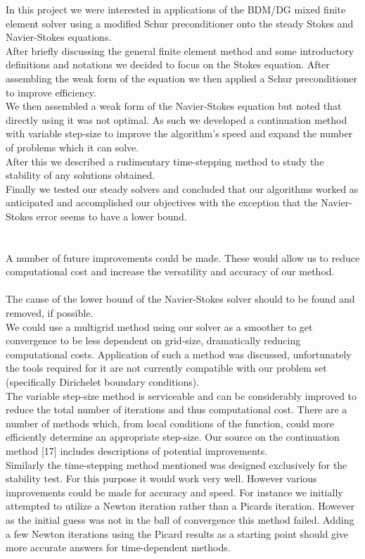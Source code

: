 \documentclass[11pt,twoside,a4paper]{article}
\begin{document}
In this project we were interested in applications of the BDM/DG mixed finite element solver using a modified Schur preconditioner onto the steady Stokes and Navier-Stokes equations.\\
After briefly discussing the general finite element method and some introductory definitions and notations we decided to focus on the Stokes equation. After assembling the weak form of the equation we then applied a Schur preconditioner to improve efficiency.\\
We then assembled a weak form of the Navier-Stokes equation but noted that directly using it was not optimal. As such we developed a continuation method with variable step-size to improve the algorithm's speed and expand the number of problems which it can solve.\\
After this we described a rudimentary time-stepping method to study the stability of any solutions obtained.\\
Finally we tested our steady solvers and concluded that our algorithms worked as anticipated and accomplished our objectives with the exception that the Navier-Stokes error seems to have a lower bound.\\
\\
\\
A number of future improvements could be made.
These would allow us to reduce computational cost and increase the versatility and accuracy of our method.\\
\\
The cause of the lower bound of the Navier-Stokes solver should to be found and removed, if possible.\\
We could use a multigrid method using our solver as a smoother to get convergence to be less dependent on grid-size, dramatically reducing computational costs. Application of such a method was discussed, unfortunately the tools required for it are not currently compatible with our problem set (specifically Dirichelet boundary conditions).\\
The variable step-size method is serviceable and can be considerably improved to reduce the total number of iterations and thus computational cost. There are a number of methods which, from local conditions of the function, could more efficiently determine an appropriate step-size. Our source on the continuation method [17] includes descriptions of potential improvements.\\
Similarly the time-stepping method mentioned was designed exclusively for the stability test. For this purpose it would work very well. However various improvements could be made for accuracy and speed. For instance we initially attempted to utilize a Newton iteration rather than a Picards iteration. However as the initial guess was not in the ball of convergence this method failed. Adding a few Newton iterations using the Picard results as a starting point should give more accurate answers for time-dependent methods.\\
\end{document}
